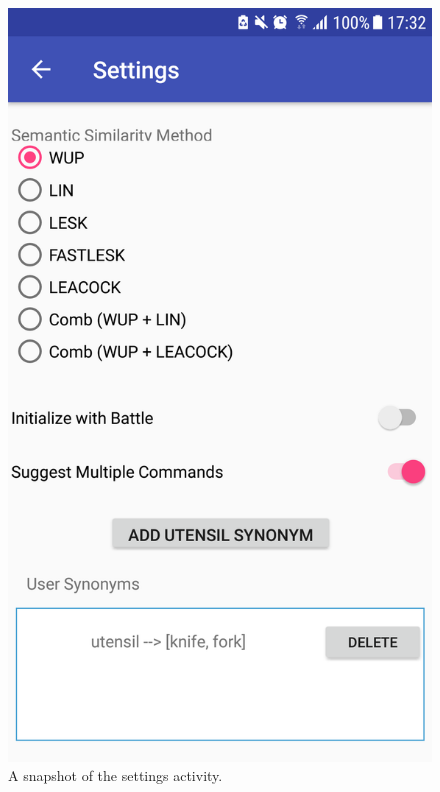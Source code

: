 \documentclass[11pt]{article}
\begin{document}
\begin{appendices}
\begin{center}
\begin{figure}[H]
\begin{center}
  \includegraphics[scale=0.25]{settings.png}
  \caption{A snapshot of the settings activity.}
  \label{fig:snapshot-settings}
  \end{center}
\end{figure}
\end{center}

\newpage

\end{appendices}
\end{document}
